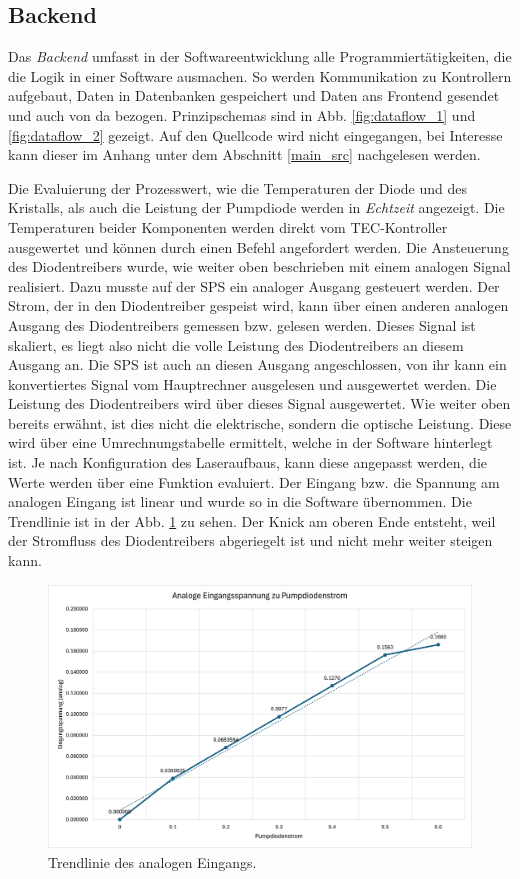 \subsection{Backend}
\label{chptr:software_backend}
Das \textit{Backend} umfasst in der Softwareentwicklung alle Programmiertätigkeiten, die die Logik in einer Software ausmachen. So werden Kommunikation zu Kontrollern aufgebaut, Daten in Datenbanken gespeichert und Daten ans Frontend gesendet und auch von da bezogen.
Prinzipschemas sind in Abb. \ref{fig:dataflow_1} und \ref{fig:dataflow_2} gezeigt. Auf den Quellcode wird nicht eingegangen, bei Interesse kann dieser im Anhang unter dem Abschnitt \ref{main_src} nachgelesen werden.

Die Evaluierung der Prozesswert, wie die Temperaturen der Diode und des Kristalls, als auch die Leistung der Pumpdiode werden in \textit{Echtzeit} angezeigt.
Die Temperaturen beider Komponenten werden direkt vom TEC-Kontroller ausgewertet und können durch einen Befehl angefordert werden.
Die Ansteuerung des Diodentreibers wurde, wie weiter oben beschrieben mit einem analogen Signal realisiert. Dazu musste auf der SPS ein analoger Ausgang gesteuert werden. Der Strom, der in den Diodentreiber gespeist wird, kann über einen anderen analogen Ausgang des Diodentreibers gemessen bzw. gelesen werden. Dieses Signal ist skaliert, es liegt also nicht die volle Leistung des Diodentreibers an diesem Ausgang an. Die SPS ist auch an diesen Ausgang angeschlossen, von ihr kann ein konvertiertes Signal vom Hauptrechner ausgelesen und ausgewertet werden. Die Leistung des Diodentreibers wird über dieses Signal ausgewertet. Wie weiter oben bereits erwähnt, ist dies nicht die elektrische, sondern die optische Leistung. Diese wird über eine Umrechnungstabelle ermittelt, welche in der Software hinterlegt ist. Je nach Konfiguration des Laseraufbaus, kann diese angepasst werden, die Werte werden über eine Funktion evaluiert.
Der Eingang bzw. die Spannung am analogen Eingang ist linear und wurde so in die Software übernommen. Die Trendlinie ist in der Abb. \ref{fig:trendlinie} zu sehen. Der Knick am oberen Ende entsteht, weil der Stromfluss des Diodentreibers abgeriegelt ist und nicht mehr weiter steigen kann.

\begin{figure}[H]
    \centering
    \includegraphics[scale=0.5]{98_images/analog_eingang_trendline.png}
    \caption{Trendlinie des analogen Eingangs.}
    \label{fig:trendlinie}
\end{figure}

